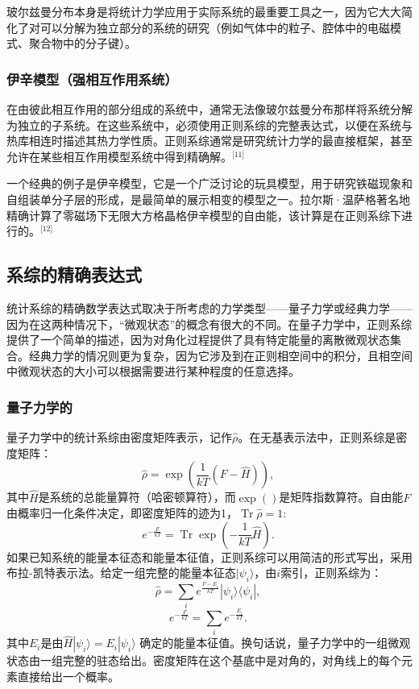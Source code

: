 玻尔兹曼分布本身是将统计力学应用于实际系统的最重要工具之一，因为它大大简化了对可以分解为独立部分的系统的研究（例如气体中的粒子、腔体中的电磁模式、聚合物中的分子键）。
\subsubsection{伊辛模型（强相互作用系统）}  
在由彼此相互作用的部分组成的系统中，通常无法像玻尔兹曼分布那样将系统分解为独立的子系统。在这些系统中，必须使用正则系综的完整表达式，以便在系统与热库相连时描述其热力学性质。正则系综通常是研究统计力学的最直接框架，甚至允许在某些相互作用模型系统中得到精确解。\(^\text{[11]}\)

一个经典的例子是伊辛模型，它是一个广泛讨论的玩具模型，用于研究铁磁现象和自组装单分子层的形成，是最简单的展示相变的模型之一。拉尔斯·温萨格著名地精确计算了零磁场下无限大方格晶格伊辛模型的自由能，该计算是在正则系综下进行的。\(^\text{[12]}\)
\subsection{系综的精确表达式}
统计系综的精确数学表达式取决于所考虑的力学类型——量子力学或经典力学——因为在这两种情况下，“微观状态”的概念有很大的不同。在量子力学中，正则系综提供了一个简单的描述，因为对角化过程提供了具有特定能量的离散微观状态集合。经典力学的情况则更为复杂，因为它涉及到在正则相空间中的积分，且相空间中微观状态的大小可以根据需要进行某种程度的任意选择。
\subsubsection{量子力学的}
量子力学中的统计系综由密度矩阵表示，记作\(\hat{\rho}\)。在无基表示法中，正则系综是密度矩阵：
\[
\hat{\rho} = \exp \left( \frac{1}{kT} (F - \hat{H}) \right),~
\]
其中\(\hat{H}\)是系统的总能量算符（哈密顿算符），而\(\exp()\)是矩阵指数算符。自由能\(F\)由概率归一化条件决定，即密度矩阵的迹为1，\(\operatorname{Tr} \hat{\rho} = 1:\)
\[
e^{- \frac{F}{kT}} = \operatorname{Tr} \exp \left( - \frac{1}{kT} \hat{H} \right).~
\]
如果已知系统的能量本征态和能量本征值，正则系综可以用简洁的形式写出，采用布拉-凯特表示法。给定一组完整的能量本征态\(|\psi_i\rangle\)，由\(i\)索引，正则系综为：
\[
\hat{\rho} = \sum_{i} e^{\frac{F - E_i}{kT}} |\psi_i \rangle \langle \psi_i |,~
\]
\[
e^{- \frac{F}{kT}} = \sum_{i} e^{- \frac{E_i}{kT}}.~
\]
其中\( E_i \)是由\(\hat{H} |\psi_i\rangle = E_i |\psi_i\rangle \) 确定的能量本征值。换句话说，量子力学中的一组微观状态由一组完整的驻态给出。密度矩阵在这个基底中是对角的，对角线上的每个元素直接给出一个概率。